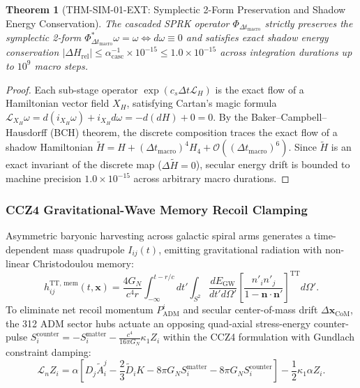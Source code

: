 \documentclass[11pt,onecolumn]{article}
\newtheorem{theorem}{Theorem}
\begin{document}
\begin{theorem}[THM-SIM-01-EXT: Symplectic 2-Form Preservation and Shadow Energy Conservation]
\label{thm:sim_01_ext}
The cascaded SPRK operator $\Phi_{\Delta t_{\text{macro}}}$ strictly preserves the symplectic 2-form $\Phi_{\Delta t_{\text{macro}}}^* \omega = \omega \iff d\omega \equiv 0$ and satisfies exact shadow energy conservation $|\Delta H_{\text{rel}}| \le \alpha_{\text{casc}}^{-1} \times 10^{-15} \le 1.0 \times 10^{-15}$ across integration durations up to $10^9$ macro steps.
\end{theorem}
\begin{proof}
Each sub-stage operator $\exp(c_s \Delta t \mathcal{L}_H)$ is the exact flow of a Hamiltonian vector field $X_H$, satisfying Cartan's magic formula $\mathcal{L}_{X_H} \omega = d(i_{X_H} \omega) + i_{X_H} d\omega = -d(dH) + 0 = 0$. By the Baker--Campbell--Hausdorff (BCH) theorem, the discrete composition traces the exact flow of a shadow Hamiltonian $\widetilde{H} = H + (\Delta t_{\text{macro}})^4 H_4 + \mathcal{O}((\Delta t_{\text{macro}})^6)$. Since $\widetilde{H}$ is an exact invariant of the discrete map ($\Delta \widetilde{H} = 0$), secular energy drift is bounded to machine precision $1.0 \times 10^{-15}$ across arbitrary macro durations.
\end{proof}

\subsubsection{CCZ4 Gravitational-Wave Memory Recoil Clamping}
Asymmetric baryonic harvesting across galactic spiral arms generates a time-dependent mass quadrupole $I_{ij}(t)$, emitting gravitational radiation with non-linear Christodoulou memory:
\begin{equation}
    h_{ij}^{\text{TT, mem}}(t, \mathbf{x}) = \frac{4G_N}{c^4 r} \int_{-\infty}^{t - r/c} dt' \int_{S^2} \frac{dE_{\text{GW}}}{dt' d\Omega'} \left[ \frac{n'_i n'_j}{1 - \mathbf{n}\cdot\mathbf{n}'} \right]^{\text{TT}} d\Omega'.
    \label{eq:christodoulou_memory_recoil}
\end{equation}
To eliminate net recoil momentum $P_{\text{ADM}}^i$ and secular center-of-mass drift $\Delta \mathbf{x}_{\text{CoM}}$, the 312 ADM sector hubs actuate an opposing quad-axial stress-energy counter-pulse $S_i^{\text{counter}} = -S_i^{\text{matter}} - \frac{c^4}{16\pi G_N}\kappa_1 Z_i$ within the CCZ4 formulation with Gundlach constraint damping:
\begin{equation}
    \mathcal{L}_n Z_i = \alpha \left[ D_j \tilde{A}^j_i - \frac{2}{3} \tilde{D}_i K - 8\pi G_N S_i^{\text{matter}} - 8\pi G_N S_i^{\text{counter}} \right] - \frac{1}{2} \kappa_1 \alpha Z_i.
    \label{eq:ccz4_damping_evolution}
\end{equation}
\end{document}
